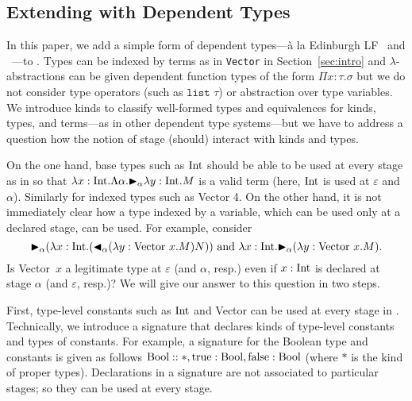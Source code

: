 \subsection{Extending \LTP with Dependent Types}


In this paper, we add a simple form of dependent types---{\`a} la
Edinburgh LF~\cite{harper1993framework} and \LLF~\cite{attapl}---to \LTP.
Types can be indexed by terms as in \texttt{Vector} in
Section~\ref{sec:intro} and \(\lambda\)-abstractions can be given
dependent function types of the form \(\Pi x:\tau. \sigma\) but we do
not consider type operators (such as $\texttt{list } \tau$) or
abstraction over type variables.  We introduce kinds to classify
well-formed types and equivalences for kinds, types, and terms---as
in other dependent type systems---but we have to address a question
how the notion of stage (should) interact with kinds and types.


On the one hand, base types such as \(\textrm{Int}\) should be able to be used at every
stage as in \LTP so that \(\lambda x:\textrm{Int}.\Lambda \alpha. {\mathop{\blacktriangleright}}_\alpha \lambda
y:\textrm{Int}.M\) is a valid term (here, \(\textrm{Int}\) is used at \(\varepsilon\) and
\(\alpha\)).  Similarly for indexed types such as Vector 4. On the other hand,
it is not immediately clear how a type indexed by a variable, which can be used
only at a declared stage, can be used.  For example, consider
\[{\mathop{\blacktriangleright}}_\alpha (\lambda x:\textrm{Int}. ({\mathop{\blacktriangleleft}}_\alpha (\lambda y:\text{Vector
  }x.M)N) )
  \text{ and }
  \lambda x:\textrm{Int}. {\mathop{\blacktriangleright}}_\alpha (\lambda y:\text{Vector }x.M).
\]
Is Vector\ \(x\) a legitimate type at \(\varepsilon\) (and \(\alpha\), resp.)
even if \(x:\textrm{Int}\) is declared at stage \(\alpha\) (and \(\varepsilon\), resp.)?
We will give our answer to this question in two steps.


First, type-level constants such as \(\textrm{Int}\) and Vector can be used at
every stage in \LMD.  Technically, we introduce a signature that
declares kinds of type-level constants and types of constants.  For
example, a signature for the Boolean type and constants is given as
follows $\textrm{Bool}::*, \text{true}:\textrm{Bool}, \text{false}:\textrm{Bool}$ (where $*$ is the
kind of proper types).  Declarations in a signature are not
associated to particular stages; so they can be used at every stage.


